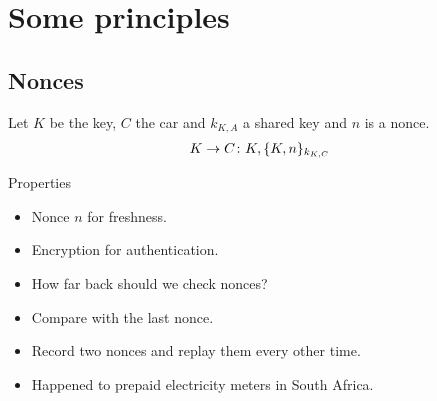 \mode*




\section{Some principles}

\subsection{Nonces}

\begin{frame}
  \begin{example}
    Let \(K\) be the key, \(C\) the car and \(k_{K, A}\) a shared key and \(n\) 
    is a nonce.
    \begin{align*}
      K\to C\colon K, \{K, n\}_{k_{K, C}}
    \end{align*}
  \end{example}

  \pause

  \begin{block}{Properties}
    \begin{itemize}
      \item Nonce \(n\) for freshness.
      \item Encryption for authentication.
    \end{itemize}
  \end{block}
\end{frame}

\begin{frame}
  \begin{question}
    \begin{itemize}
      \item How far back should we check nonces?
    \end{itemize}
  \end{question}

  \begin{example}
    \begin{itemize}
      \item Compare with the last nonce.
      \item Record two nonces and replay them every other time.
      \item Happened to prepaid electricity meters in South Africa.
    \end{itemize}
  \end{example}
\end{frame}

